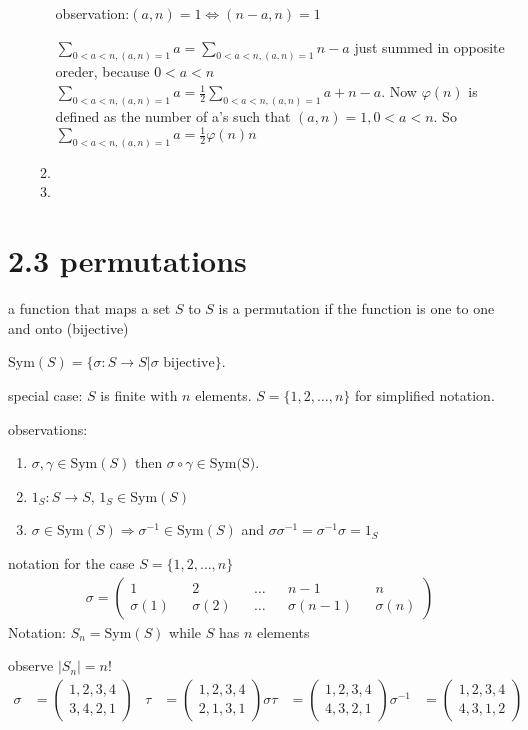 \documentclass[letterpaper]{article}
\begin{document}
\begin{enumerate}
\begin{enumerate}
  observation:$(a,n)=1\Leftrightarrow(n-a,n)=1$

  $\sum\limits_{0<a<n,(a,n)=1}{a}=\sum\limits_{0<a<n,(a,n)=1}{n-a}$ just summed in opposite oreder, because $0<a<n$
  $\sum\limits_{0<a<n,(a,n)=1}{a}=\frac{1}{2}\sum\limits_{0<a<n,(a,n)=1}{a+n-a}$. Now $\varphi(n)$ is defined as the number of a's such that $(a,n)=1, 0<a<n$. So $\sum\limits_{0<a<n,(a,n)=1}{a}=\frac{1}{2}\varphi(n)n$
  \item

  \setcounter{enumii}{26}
  \item
  \end{enumerate}
\end{enumerate}
\section*{2.3 permutations}
a function that maps a set $S$ to $S$ is a permutation if the function is one to one and onto (bijective)

$\text{Sym}(S)=\{\sigma:S\to S|\sigma\text{ bijective}\}$.

special case: $S$ is finite with $n$ elements. $S=\{1,2,\dots,n\}$ for simplified notation.

observations:
\begin{enumerate}
\item
$\sigma,\gamma\in\text{Sym}(S)$ then $\sigma\circ\gamma\in\text{Sym(S)}$.
\item
$1_S:S\to S$, $1_S\in\text{Sym}(S)$
\item
$\sigma\in\text{Sym}(S)\Rightarrow\sigma^{-1}\in\text{Sym}(S)$ and $\sigma\sigma^{-1}=\sigma^{-1}\sigma=1_S$
\end{enumerate}
notation for the case $S=\{1,2,\dots,n\}$
\begin{align*}
\sigma=\left(
  \begin{aligned}
    1&&2&&\dots&&n-1&&n\\
    \sigma(1)&&\sigma(2)&&\dots&&\sigma(n-1)&&\sigma(n)
  \end{aligned}
  \right)
\end{align*}
  Notation: $S_n=\text{Sym}(S)$ while $S$ has $n$ elements

  observe $\left\lvert S_n\right\rvert=n!$
  \begin{align*}
    \sigma&=\left(\begin{aligned}
      1,2,3,4\\
      3,4,2,1
    \end{aligned}\right)&
    \tau&=\left(\begin{aligned}
      1,2,3,4\\
      2,1,3,1
    \end{aligned}\right)
    \sigma\tau&=\left(\begin{aligned}
      1,2,3,4\\
      4,3,2,1
    \end{aligned}\right)
    \sigma^{-1}&=\left(\begin{aligned}
      1,2,3,4\\
      4,3,1,2
    \end{aligned}\right)
  \end{align*}
\end{document}

